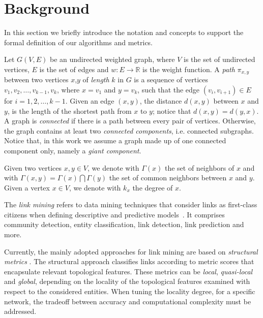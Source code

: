 \section{Background}
\label{sec:background}


In this section we briefly introduce the notation and concepts to support the formal definition of our algorithms and metrics.

Let $G(V,E)$ be an undirected weighted graph, where $V$ is the set of undirected vertices, $E$ is the set of edges and $w:E\rightarrow\mathbb{R}$ is the weight function. 
%
A \textit{path} $\pi_{x,y}$ between two vertices $x$,$y$ of \textit{length} $k$ in $G$ is a sequence of vertices $v_{1},v_{2},\ldots,v_{k-1},v_{k}$, where $x = v_{1}$ and $y = v_{k}$, such that the edge $(v_{i},v_{i+1}) \in E$ for $i = 1, 2,\ldots,k-1$. 
%
Given an edge $(x,y)$, the distance $d(x,y)$ between $x$ and $y$, is the length of the shortest path from $x$ to $y$; notice that $d(x,y)=d(y,x)$.
%
A graph is \textit{connected} if there is a path between every pair of vertices. 
Otherwise, the graph contains at least two \textit{connected components}, i.e. connected subgraphs.
%
Notice that, in this work we assume a graph made up of one connected component only, namely a \textit{giant component}.

Given two vertices $x,y \in V$, we denote with $\Gamma(x)$ the set of neighbors of $x$ and with $\Gamma(x,y) = \Gamma(x) \bigcap \Gamma(y)$ the set of common neighbors between $x$ and $y$. Given a vertex $x \in V$, we denote with $k_{x}$ the degree of $x$.

The \textit{link mining} refers to data mining techniques that consider links as first-class citizens when defining descriptive and predictive models~\cite{getoor2005link}. It comprises community detection, entity classification, link detection, link prediction and more. 

Currently, the mainly adopted approaches for link mining are based on \textit{structural metrics} \cite{berlusconi2016link,Liben-Nowell,Lu2011}.
The structural approach classifies links according to metric scores that encapsulate relevant topological features. 
These metrics can be \textit{local}, \textit{quasi-local} and \textit{global}, depending on the locality of the topological features examined with respect to the considered entities. 
When tuning the locality degree, for a specific network, the  tradeoff between accuracy and computational complexity must be addressed.

